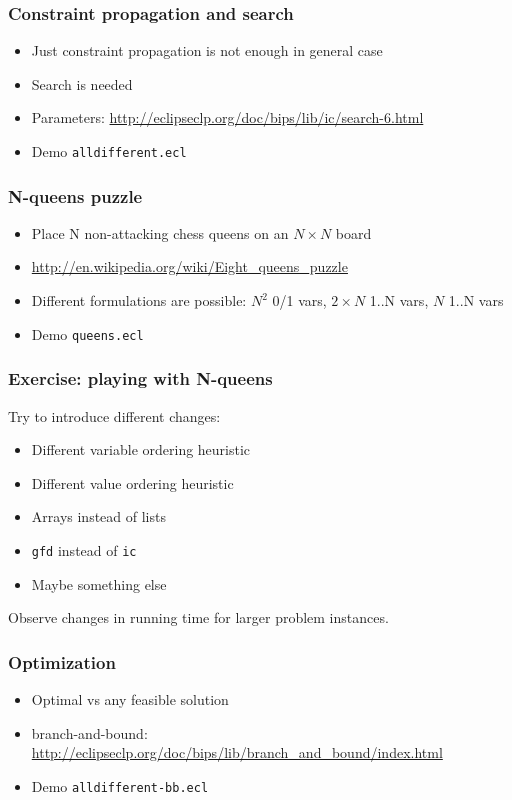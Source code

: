 \documentclass{beamer}
\begin{document}
\begin{frame}
\frametitle{Constraint propagation and search}
\begin{itemize}
\item Just constraint propagation is not enough in general case
\item Search is needed
\item Parameters: \url{http://eclipseclp.org/doc/bips/lib/ic/search-6.html}
\item Demo \texttt{alldifferent.ecl}
\end{itemize}
\end{frame}

\begin{frame}
\frametitle{N-queens puzzle}
\begin{itemize}
\item Place N non-attacking chess queens on an $N \times N$ board
\item \url{http://en.wikipedia.org/wiki/Eight_queens_puzzle}
\item Different formulations are possible: $N^2$ 0/1 vars, $2 \times N$ 1..N vars, $N$ 1..N vars
\item Demo \texttt{queens.ecl}
\end{itemize}
\end{frame}

\begin{frame}
\frametitle{Exercise: playing with N-queens}
Try to introduce different changes:
\begin{itemize}
\item Different variable ordering heuristic
\item Different value ordering heuristic
\item Arrays instead of lists
\item \texttt{gfd} instead of \texttt{ic}
\item Maybe something else
\end{itemize}
Observe changes in running time for larger problem instances.
\end{frame}

\begin{frame}
\frametitle{Optimization}
\begin{itemize}
\item Optimal vs any feasible solution
\item branch-and-bound: \url{http://eclipseclp.org/doc/bips/lib/branch_and_bound/index.html}
\item Demo \texttt{alldifferent-bb.ecl}
\end{itemize}
\end{frame}
\end{document}
